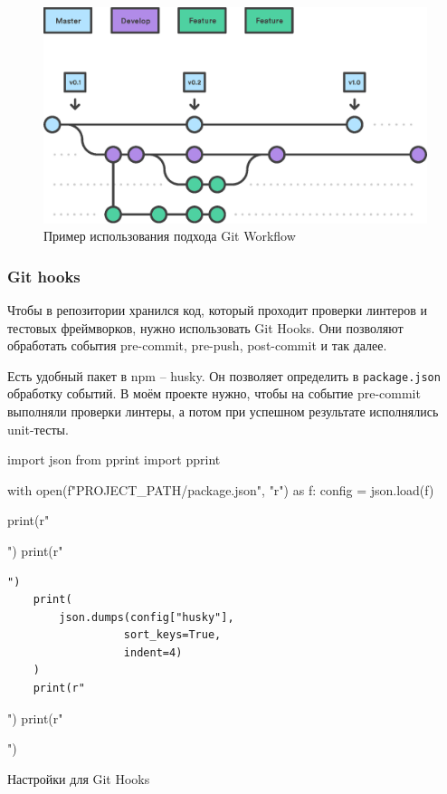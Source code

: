 \begin{figure}[h!]
    \begin{center}
        \includegraphics[scale=0.6]{images/git-workflow.eps}
    \end{center}
    \caption{Пример использования подхода Git Workflow}
\end{figure}

\subsubsection{Git hooks}
Чтобы в репозитории хранился код, который проходит проверки линтеров и тестовых фреймворков, нужно использовать Git Hooks. Они позволяют обработать события pre-commit, pre-push, post-commit и так далее.

Есть удобный пакет в npm -- husky. Он позволяет определить в \texttt{package.json} обработку событий. В моём проекте нужно, чтобы на событие pre-commit выполняли проверки линтеры, а потом при успешном результате исполнялись unit-тесты.

\begin{listing}[h!]
\begin{pycode}
import json
from pprint import pprint

with open(f"{PROJECT_PATH}/package.json", "r") as f:
    config = json.load(f)

    print(r"\begin{noerr}")
    print(r"\begin{verbatim}")
    print(
        json.dumps(config["husky"],
                  sort_keys=True,
                  indent=4)
    )
    print(r"\end{verbatim}")
    print(r"\end{noerr}")
\end{pycode}
\caption{Настройки для Git Hooks}
\end{listing}

\clearpage